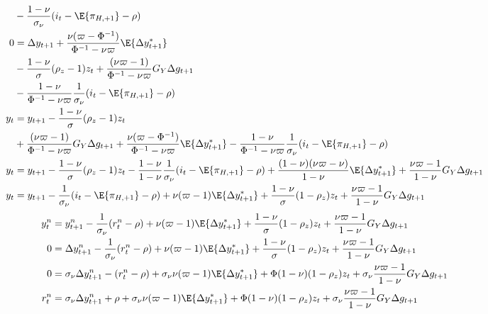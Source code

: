 \begin{align*}
        &- \frac{1-\nu}{\sigma_\nu}(i_t - \E \{ \pi_{H,+1}\} - \rho)\\
    0  &= \Delta y_{t+1} + \frac{\nu (\varpi - \Phi^{-1})}{\Phi^{-1} -\nu \varpi}\E \{\Delta y_{t+1}^* \} \\
        &  -\frac{1-\nu}{\sigma} (\rho_z - 1)z_t + \frac{(\nu \varpi  - 1)}{\Phi^{-1} -\nu \varpi} G_Y \Delta g_{t+1}\\
        &- \frac{1-\nu}{\Phi^{-1} -\nu \varpi}\frac{1}{\sigma_\nu}(i_t - \E \{ \pi_{H,+1}\} - \rho)\\
    y_t  &= y_{t+1}  -\frac{1-\nu}{\sigma} (\rho_z - 1)z_t \\
        & + \frac{(\nu \varpi  - 1)}{\Phi^{-1} -\nu \varpi} G_Y \Delta g_{t+1} + \frac{\nu (\varpi - \Phi^{-1})}{\Phi^{-1} -\nu \varpi}\E \{\Delta y_{t+1}^* \} - \frac{1-\nu}{\Phi^{-1} -\nu \varpi}\frac{1}{\sigma_\nu}(i_t - \E \{ \pi_{H,+1}\} - \rho) \\
    y_t  &= y_{t+1}  -\frac{1-\nu}{\sigma} (\rho_z - 1)z_t - \frac{1-\nu}{1-\nu}\frac{1}{\sigma_\nu}(i_t - \E \{ \pi_{H,+1}\} - \rho) + \frac{(1-\nu)(\nu \varpi - \nu)}{1 - \nu}\E \{\Delta y_{t+1}^* \} + \frac{\nu \varpi  - 1}{1-\nu} G_Y \Delta g_{t+1}\\
    y_t  &= y_{t+1} - \frac{1}{\sigma_\nu}(i_t - \E \{ \pi_{H,+1}\} - \rho) + \nu (\varpi - 1)\E \{\Delta y_{t+1}^* \}  + \frac{1-\nu}{\sigma} (1-\rho_z)z_t + \frac{\nu \varpi  - 1}{1-\nu} G_Y \Delta g_{t+1}
\end{align*}
\begin{align}
    y^n_t  &= y^n_{t+1} - \frac{1}{\sigma_\nu}(r^n_t - \rho) + \nu (\varpi - 1)\E \{\Delta y_{t+1}^* \}  + \frac{1-\nu}{\sigma} (1-\rho_z)z_t + \frac{\nu \varpi  - 1}{1-\nu} G_Y \Delta g_{t+1}\\
    0  &= \Delta y^n_{t+1} - \frac{1}{\sigma_\nu}(r^n_t - \rho) + \nu (\varpi - 1)\E \{\Delta y_{t+1}^* \}  + \frac{1-\nu}{\sigma} (1-\rho_z)z_t + \frac{\nu \varpi  - 1}{1-\nu} G_Y \Delta g_{t+1}\\
    0  &= \sigma_\nu \Delta y^n_{t+1} - (r^n_t - \rho) + \sigma_\nu \nu (\varpi - 1)\E \{\Delta y_{t+1}^* \}  + \Phi (1-\nu)(1-\rho_z)z_t + \sigma_\nu \frac{\nu \varpi  - 1}{1-\nu} G_Y \Delta g_{t+1}\\
    r^n_t  &= \sigma_\nu \Delta y^n_{t+1} + \rho + \sigma_\nu \nu (\varpi - 1)\E \{\Delta y_{t+1}^* \}  + \Phi (1-\nu)(1-\rho_z)z_t + \sigma_\nu \frac{\nu \varpi  - 1}{1-\nu} G_Y \Delta g_{t+1}\\
\end{align}
